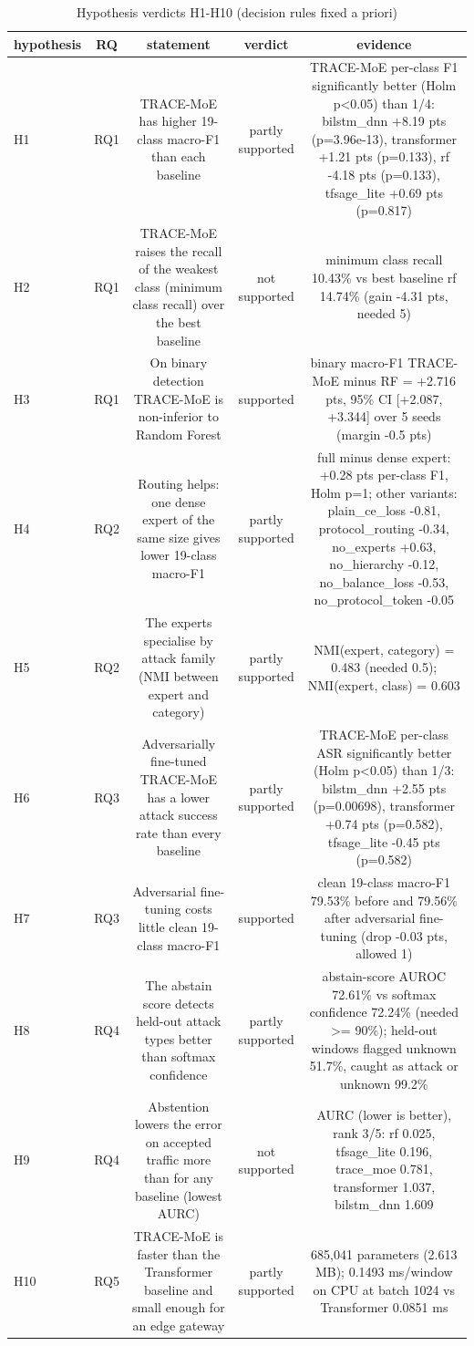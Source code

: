 \begin{table}[htbp]
\centering
\caption{Hypothesis verdicts H1-H10 (decision rules fixed a priori)}
\label{tab:hypotheses}
\begin{tabular}{lcccc}
\toprule
hypothesis & RQ & statement & verdict & evidence \\
\midrule
H1 & RQ1 & TRACE-MoE has higher 19-class macro-F1 than each baseline & partly supported & TRACE-MoE per-class F1 significantly better (Holm p<0.05) than 1/4: bilstm\_dnn +8.19 pts (p=3.96e-13), transformer +1.21 pts (p=0.133), rf -4.18 pts (p=0.133), tfsage\_lite +0.69 pts (p=0.817) \\
H2 & RQ1 & TRACE-MoE raises the recall of the weakest class (minimum class recall) over the best baseline & not supported & minimum class recall 10.43\% vs best baseline rf 14.74\% (gain -4.31 pts, needed 5) \\
H3 & RQ1 & On binary detection TRACE-MoE is non-inferior to Random Forest & supported & binary macro-F1 TRACE-MoE minus RF = +2.716 pts, 95\% CI [+2.087, +3.344] over 5 seeds (margin -0.5 pts) \\
H4 & RQ2 & Routing helps: one dense expert of the same size gives lower 19-class macro-F1 & partly supported & full minus dense expert: +0.28 pts per-class F1, Holm p=1; other variants: plain\_ce\_loss -0.81, protocol\_routing -0.34, no\_experts +0.63, no\_hierarchy -0.12, no\_balance\_loss -0.53, no\_protocol\_token -0.05 \\
H5 & RQ2 & The experts specialise by attack family (NMI between expert and category) & partly supported & NMI(expert, category) = 0.483 (needed 0.5); NMI(expert, class) = 0.603 \\
H6 & RQ3 & Adversarially fine-tuned TRACE-MoE has a lower attack success rate than every baseline & partly supported & TRACE-MoE per-class ASR significantly better (Holm p<0.05) than 1/3: bilstm\_dnn +2.55 pts (p=0.00698), transformer +0.74 pts (p=0.582), tfsage\_lite -0.45 pts (p=0.582) \\
H7 & RQ3 & Adversarial fine-tuning costs little clean 19-class macro-F1 & supported & clean 19-class macro-F1 79.53\% before and 79.56\% after adversarial fine-tuning (drop -0.03 pts, allowed 1) \\
H8 & RQ4 & The abstain score detects held-out attack types better than softmax confidence & partly supported & abstain-score AUROC 72.61\% vs softmax confidence 72.24\% (needed >= 90\%); held-out windows flagged unknown 51.7\%, caught as attack or unknown 99.2\% \\
H9 & RQ4 & Abstention lowers the error on accepted traffic more than for any baseline (lowest AURC) & not supported & AURC (lower is better), rank 3/5: rf 0.025, tfsage\_lite 0.196, trace\_moe 0.781, transformer 1.037, bilstm\_dnn 1.609 \\
H10 & RQ5 & TRACE-MoE is faster than the Transformer baseline and small enough for an edge gateway & partly supported & 685,041 parameters (2.613 MB); 0.1493 ms/window on CPU at batch 1024 vs Transformer 0.0851 ms \\
\bottomrule
\end{tabular}
\end{table}